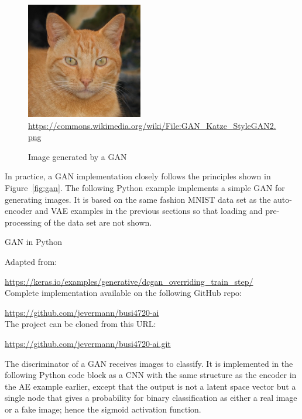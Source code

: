 \begin{figure}
\begin{center}
\includegraphics[height=2in]{GAN_Katze_StyleGAN2.png} \\

\scriptsize \url{https://commons.wikimedia.org/wiki/File:GAN_Katze_StyleGAN2.png} \normalsize
\end{center}
\caption{Image generated by a GAN}
\label{fig:gancat}
\end{figure}

In practice, a GAN implementation closely follows the principles shown in Figure~\ref{fig:gan}. The following Python example implements a simple GAN for generating images. It is based on the same fashion MNIST data set as the auto-encoder and VAE examples in the previous sections so that loading and pre-processing of the data set are not shown.

\begin{resourcebox}{GAN in Python}

Adapted from: 

\small\url{https://keras.io/examples/generative/dcgan_overriding_train_step/}\normalsize \\

Complete implementation available on the following GitHub repo:

\small\url{https://github.com/jevermann/busi4720-ai}\normalsize \\

The project can be cloned from this URL:

\small\url{https://github.com/jevermann/busi4720-ai.git}\normalsize
\end{resourcebox}

The discriminator of a GAN receives images to classify. It is implemented in the following Python code block as a CNN with the same structure as the encoder in the AE example earlier, except that the output is not a latent space vector but a single node that gives a probability for binary classification as either a real image or a fake image; hence the sigmoid activation function.


